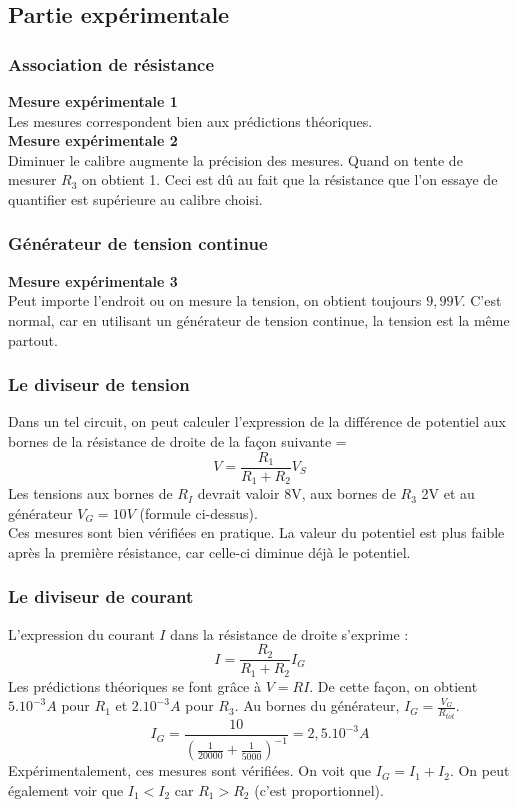 \documentclass	[11pt, a4paper, openany]{book}
\begin{document}
		\subsection{Partie expérimentale}
		\subsubsection*{Association de résistance}
		\textbf{Mesure expérimentale 1}\\
		Les mesures correspondent bien aux prédictions théoriques.\\
		
		\textbf{Mesure expérimentale 2}\\
		Diminuer le calibre augmente la précision des mesures. Quand on tente de mesurer $R_3$ on obtient 1. Ceci est dû au fait que la résistance que l'on essaye de quantifier est supérieure au calibre choisi.
		
		\subsubsection*{Générateur de tension continue}
		\textbf{Mesure expérimentale 3}\\
		Peut importe l'endroit ou on mesure la tension, on obtient toujours $9,99 V$. C'est normal, car en utilisant un générateur de tension continue, la tension est la même partout.
		
		\subsubsection*{Le diviseur de tension}
		Dans un tel circuit, on peut calculer l'expression de la différence de potentiel aux bornes de la résistance de droite de la façon suivante = 
		\begin{equation}
			V = \frac{R_1}{R_1 + R_2}V_S
		\end{equation}
		Les tensions aux bornes de $R_I$ devrait valoir 8V, aux bornes de $R_3$ 2V et au générateur $V_G = 10V$ (formule ci-dessus).\\
		Ces mesures sont bien vérifiées en pratique. La valeur du potentiel est plus faible après la première résistance, car celle-ci diminue déjà le potentiel.
		
		\subsubsection*{Le diviseur de courant}
		L'expression du courant $I$ dans la résistance de droite s'exprime : 
		\begin{equation}
			I = \frac{R_2}{R_1 + R_2}I_G
		\end{equation}
		Les prédictions théoriques se font grâce à $V = RI$. De cette façon, on obtient $5.10^{-3} A$ pour $R_1$ et $2.10^{-3} A$ pour $R_3$. Au bornes du générateur, $I_G = \frac{V_G}{R_{tot}}
		$.
		\begin{equation}
			I_G = \frac{10}{\left(\frac{1}{20000} + \frac{1}{5000} \right)^{-1}} = 2,5.10^{-3} A
		\end{equation}
		Expérimentalement, ces mesures sont vérifiées. On voit que $I_G = I_1 + I_2$. 
		On peut également voir que $I_1 < I_2$ car $R_1 > R_2$ (c'est proportionnel).
		
\end{document}
